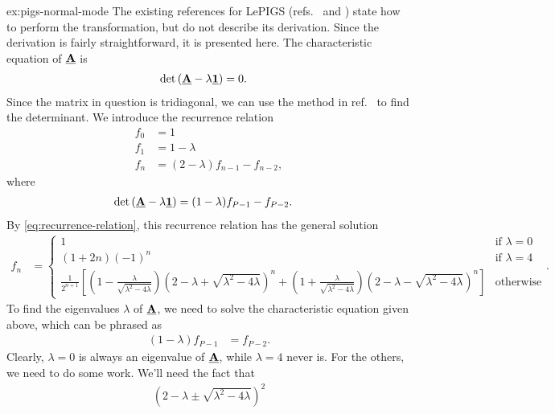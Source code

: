 \begin{DefAnswer}{ex:pigs-normal-mode}
	The existing references for LePIGS (refs.~\cite[63-66]{constable2012path} and \cite{constable2013langevin}) state how to perform the transformation, but do not describe its derivation.
	Since the derivation is fairly straightforward, it is presented here.
	The characteristic equation of $\underline{\bm{\mathbf{A}}}$ is
	\begin{align}
		\det{\left( \underline{\bm{\mathbf{A}}} - \lambda \underline{\bm{\mathbf{1}}} \right)}
		&= 0.
	\end{align}
	Since the matrix in question is tridiagonal, we can use the method in ref.~\cite{el2004inverse} to find the determinant.
	We introduce the recurrence relation
	\begin{subequations} \label{eq:pigs-recurrence}
	\begin{align}
		f_0
		&= 1 \\
		f_1
		&= 1 - \lambda \\
		f_n
		&= (2 - \lambda) f_{n-1} - f_{n-2},
	\end{align}
	\end{subequations}
	where
	\begin{align}
		\det{\left( \underline{\bm{\mathbf{A}}} - \lambda \underline{\bm{\mathbf{1}}} \right)}
		&= (1 - \lambda) f_{P-1} - f_{P-2}.
	\end{align}
	By \cref{eq:recurrence-relation}, this recurrence relation has the general solution
	\begin{align}
		f_n
		&= \begin{cases}
				1 & \text{if } \lambda = 0 \\
				(1 + 2 n) (-1)^n & \text{if } \lambda = 4 \\
				\frac{1}{2^{n+1}}
					\left[ \left( 1 - \frac{\lambda}{\sqrt{\lambda^2 - 4 \lambda}} \right)
								\left( 2 - \lambda + \sqrt{\lambda^2 - 4 \lambda} \right)^n
							+ \left( 1 + \frac{\lambda}{\sqrt{\lambda^2 - 4 \lambda}} \right)
								\left( 2 - \lambda - \sqrt{\lambda^2 - 4 \lambda} \right)^n
						\right]
					& \text{otherwise}
			\end{cases}.
	\end{align}
	To find the eigenvalues $\lambda$ of $\underline{\bm{\mathbf{A}}}$, we need to solve the characteristic equation given above, which can be phrased as
	\begin{align}
		(1 - \lambda) f_{P-1}
		&= f_{P-2}.
	\end{align}
	Clearly, $\lambda = 0$ is always an eigenvalue of $\underline{\bm{\mathbf{A}}}$, while $\lambda = 4$ never is.
	For the others, we need to do some work.
	We'll need the fact that
	\begin{align}
		\left( 2 - \lambda \pm \sqrt{\lambda^2 - 4 \lambda} \right)^2

\end{align}
\end{DefAnswer}
